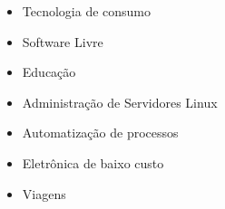 \documentclass[a4paper,10pt]{article}
\begin{document}
\begin{itemize}
    \item Tecnologia de consumo
    \item Software Livre
    \item Educação
    \item Administração de Servidores Linux
    \item Automatização de processos
    \item Eletrônica de baixo custo
    \item Viagens
\end{itemize}



\vfill
\hrulefill\\
\center{\footnotesize{\today}}
\end{document}

